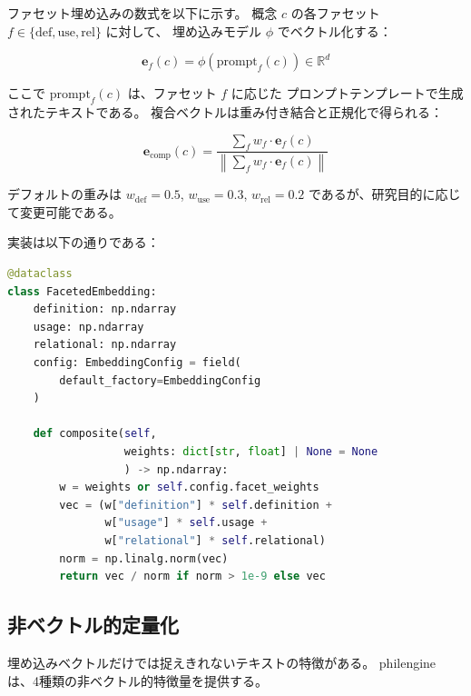 \documentclass[a4paper,11pt]{ltjsarticle}
\begin{document}
ファセット埋め込みの数式を以下に示す。
概念 $c$ の各ファセット $f \in \{\text{def}, \text{use}, \text{rel}\}$ に対して、
埋め込みモデル $\phi$ でベクトル化する：

\begin{equation}\label{eq:facet}
  \mathbf{e}_f(c) = \phi(\text{prompt}_f(c)) \in \mathbb{R}^d
\end{equation}

ここで $\text{prompt}_f(c)$ は、ファセット $f$ に応じた
プロンプトテンプレートで生成されたテキストである。
複合ベクトルは重み付き結合と正規化で得られる：

\begin{equation}\label{eq:composite}
  \mathbf{e}_{\text{comp}}(c) = \frac{\sum_{f} w_f \cdot \mathbf{e}_f(c)}{\left\|\sum_{f} w_f \cdot \mathbf{e}_f(c)\right\|}
\end{equation}

デフォルトの重みは $w_{\text{def}} = 0.5$, $w_{\text{use}} = 0.3$,
$w_{\text{rel}} = 0.2$ であるが、研究目的に応じて変更可能である。

実装は以下の通りである：

\begin{lstlisting}[language=Python,caption=FacetedEmbedding の実装]
@dataclass
class FacetedEmbedding:
    definition: np.ndarray
    usage: np.ndarray
    relational: np.ndarray
    config: EmbeddingConfig = field(
        default_factory=EmbeddingConfig
    )

    def composite(self,
                  weights: dict[str, float] | None = None
                  ) -> np.ndarray:
        w = weights or self.config.facet_weights
        vec = (w["definition"] * self.definition +
               w["usage"] * self.usage +
               w["relational"] * self.relational)
        norm = np.linalg.norm(vec)
        return vec / norm if norm > 1e-9 else vec
\end{lstlisting}

\subsection{非ベクトル的定量化}

埋め込みベクトルだけでは捉えきれないテキストの特徴がある。
philengine は、4種類の非ベクトル的特徴量を提供する。
\end{document}
